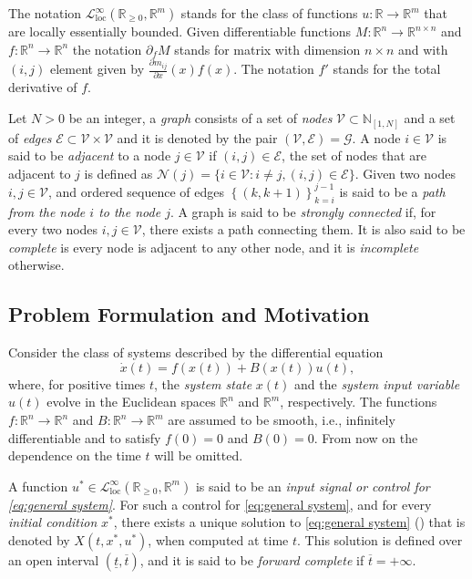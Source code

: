 \documentclass[10pt,twocolumn,twoside]{IEEEtran}
\theoremstyle{plain}
\theoremstyle{definition}
\theoremstyle{remark}
\begin{document}
The notation $\mathcal{L}_{\mathrm{loc}}^\infty(\mathbb{R}_{\geq0},\mathbb{R}^m)$ stands for the class of functions $u:\mathbb{R}\to\mathbb{R}^m$ that are locally essentially bounded. Given differentiable functions $M:\mathbb{R}^n\to\mathbb{R}^{n\times n}$ and $f:\mathbb{R}^n\to\mathbb{R}^n$ the notation $\partial_fM$ stands for matrix with dimension $n\times n$ and with $(i,j)$ element given by $\frac{\partial m_{ij}}{\partial x}(x)f(x)$. The notation $f'$ stands for the total derivative of $f$.

Let $N>0$ be an integer, a \emph{graph} consists of a set of \emph{nodes} $\mathscr{V}\subset\mathbb{N}_{[1,N]}$ and a set of \emph{edges} $\mathscr{E}\subset\mathscr{V}\times\mathscr{V}$ and it is denoted by the pair $(\mathscr{V},\mathscr{E})=\mathscr{G}$. A node $i\in\mathscr{V}$ is said to be \emph{adjacent} to a node $j\in\mathscr{V}$ if $(i,j)\in\mathscr{E}$, the set of nodes that are adjacent to $j$ is defined as $\mathscr{N}(j)=\{i\in\mathscr{V}:i\neq j,(i,j)\in\mathscr{E}\}$. Given two nodes $i,j\in\mathscr{V}$, and ordered sequence of edges $\left\{(k,k+1)\right\}_{k=i}^{j-1}$ is said to be a \emph{path from the node $i$ to the node $j$}. A graph is said to be \emph{strongly connected} if, for every two nodes $i,j\in\mathscr{V}$, there exists a path connecting them. It is also said to be \emph{complete} is every node is adjacent to any other node, and it is \emph{incomplete} otherwise.


\subsection{Problem Formulation and Motivation}\label{sec:Problem Formulation and Motivation}

 Consider the class of systems described by the differential equation
\begin{equation}\label{eq:general system}
	\dot{x}(t)=f(x(t))+B(x(t))u(t),	
\end{equation}
where, for positive times $t$, the \emph{system state} $x(t)$ and the \emph{system input variable} $u(t)$ evolve in the Euclidean spaces $\mathbb{R}^n$ and $\mathbb{R}^m$, respectively. The functions $f:\mathbb{R}^n\to\mathbb{R}^n$ and $B:\mathbb{R}^n\to\mathbb{R}^m$ are assumed to be smooth, i.e., infinitely differentiable and to satisfy $f(0)=0$ and $B(0)=0$. From now on the dependence on the time $t$ will be omitted.

A function $u^\ast\in\mathcal{L}_{\mathrm{loc}}^\infty(\mathbb{R}_{\geq0},\mathbb{R}^m)$ is said to be an \emph{input signal or control for \eqref{eq:general system}}. For such a control for \eqref{eq:general system}, and for every \emph{initial condition} $x^\ast$, there exists a unique solution to \eqref{eq:general system} (\cite{Teschl2012}) that is denoted by $X(t,x^\ast,u^\ast)$, when computed at time $t$. This solution is defined over an open interval $(\underline{t},\overline{t})$, and it is said to be \emph{forward complete} if $\overline{t}=+\infty$.
\end{document}
